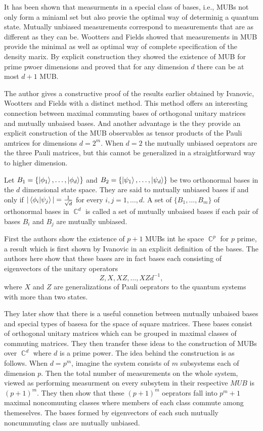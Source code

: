 \documentclass[a4paper]{article}
\DeclareMathOperator{\C}{\mathbb{C}}
\begin{document}
  It has been shown that measurments in a special class of
  bases, i.e., MUBs not only form a miniaml set but also
  provie the optimal way of determinig a quantum state.
  Mutually unbiased measurements correspond to measurements
  that are as different as they can be. Wootters and Fields
  showed that measurements in MUB provide the minimal as
  well as optimal way of complete specification of the
  density marix. By explicit construction they showed the
  existence of MUB for prime pwoer dimensions and proved
  that for any dimension $d$ there can be at most $d+1$ MUB.

  The author gives a constructive proof of the results
  earlier obtained by Ivanovic, Wootters and Fields with a
  distinct method. This method offers an interesting
  connection between maximal commuting bases of orthogonal
  unitary matrices and mutually unbaised bases. And another
  advantage is the they provide an explicit construction of
  the MUB observables as tensor products of the Pauli
  amtrices for dimensions $d = 2^{m}$. When $d = 2$ the
  mutually unbiased oeprators are the three Pauli matrices,
  but this cannot be generalized in a straightforward way to
  higher dimension.

  Let $B_1 = \{\ket{\phi_1},\ldots,\ket{\phi_d}\}$ and $B_2
  = \{\ket{\psi_1},\ldots,\ket{\psi_d}\}$ be two orthonormal
  bases in the $d$ dimensional state space. They are said to
  mutually unbiased bases if and only if
  $|\braket{\phi_i|\psi_j}| = \frac{1}{\sqrt{d}}$ for every
  $i,j = 1,\ldots,d$. A set of $\{B_1,\ldots,B_m\}$ of
  orthonormal bases in $\C^{d}$ is called a set of mutually
  unbaised bases if each pair of bases $B_i$ and $B_j$ are
  mutually unbiased.

  First the authors show the existence of $p+1$ MUBs int he
  space $\C^{p}$ for $p$ prime, a result which is first
  shown by Ivanovic in an explicit definition of the bases.
  The authors here show that these bases are in fact bases
  each consisting of eigenvectors of the unitary operators
  \[
    Z,X,XZ,\ldots,XZd^{-1},
  \] 
  where $X$ and $Z$ are generalizations of Pauli oeprators
  to the quantum systems with more than two states.

  They later show that there is a useful connetion between
  mutually unbaised bases and special types of basesa for
  the space of square matrices. These bases consist of
  orthogonal unitary matrices which can be grouped in
  maximal classes of commuting matrices. They then transfer
  these ideas to the construction of MUBs over  $\C^{d}$ 
  where $d$ is a prime power. The idea behind the
  construction is as follows. When $d = p^{m}$, imagine the
  system consists of $m$ subsystems each of dimension $p$.
  Then the total number of measurements on the whole system,
  viewed as performing measurment on every subsytem in their
  respective $MUB$ is $(p+1)^{m}$. They then show that these
  $(p+1)^{m}$ oeprators fall into $p^{m}+1$ maximal
  noncomuuting classes where members of each class commute
  among themeselves. The bases formed by eigenvectors of
  each such mutually noncummuting class are mutually
  unbiased.
\end{document}
